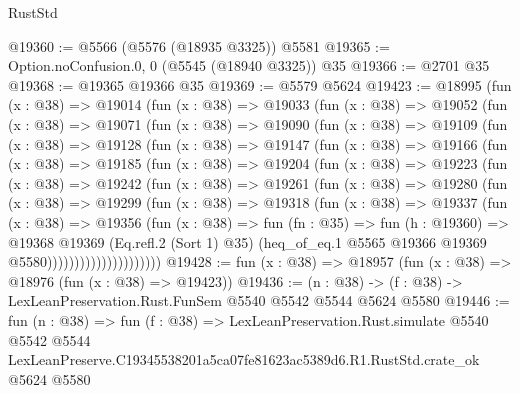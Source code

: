 \begin{lexlean}{RustStd}
\begin{coremodule}
@19360 := @5566 (@5576 (@18935 @3325)) @5581
@19365 := Option.noConfusion.{0, 0} (@5545 (@18940 @3325)) @35
@19366 := @2701 @35
@19368 := @19365 @19366 @35
@19369 := @5579 @5624
@19423 := @18995
    (fun (x : @38) =>
    @19014
      (fun (x : @38) =>
      @19033
        (fun (x : @38) =>
        @19052
          (fun (x : @38) =>
          @19071
            (fun (x : @38) =>
            @19090
              (fun (x : @38) =>
              @19109
                (fun (x : @38) =>
                @19128
                  (fun (x : @38) =>
                  @19147
                    (fun (x : @38) =>
                    @19166
                      (fun (x : @38) =>
                      @19185
                        (fun (x : @38) =>
                        @19204
                          (fun (x : @38) =>
                          @19223
                            (fun (x : @38) =>
                            @19242
                              (fun (x : @38) =>
                              @19261
                                (fun (x : @38) =>
                                @19280
                                  (fun (x : @38) =>
                                  @19299
                                    (fun (x : @38) =>
                                    @19318
                                      (fun (x : @38) =>
                                      @19337
                                        (fun (x : @38) =>
                                        @19356
                                          (fun (x : @38) =>
                                          fun (fn : @35) =>
                                          fun (h : @19360) =>
                                          @19368
                                            @19369
                                            (Eq.refl.{2} (Sort 1) @35)
                                            (heq_of_eq.{1}
                                              @5565
                                              @19366
                                              @19369
                                              @5580)))))))))))))))))))))
@19428 := fun (x : @38) => @18957 (fun (x : @38) => @18976 (fun (x : @38) => @19423))
@19436 := (n : @38) -> (f : @38) -> LexLeanPreservation.Rust.FunSem @5540 @5542 @5544 @5624 @5580
@19446 := fun (n : @38) =>
  fun (f : @38) =>
  LexLeanPreservation.Rust.simulate
    @5540
    @5542
    @5544
    LexLeanPreserve.C19345538201a5ca07fe81623ac5389d6.R1.RustStd.crate_ok
    @5624
    @5580
\end{coremodule}
\end{lexlean}
